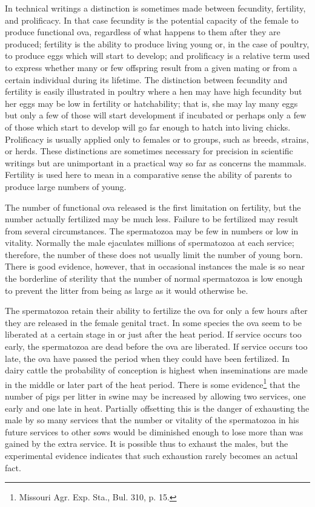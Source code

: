 In technical writings a distinction is sometimes made between fecundity,
fertility, and prolificacy. In that case fecundity is the potential
capacity of the female to produce functional ova, regardless of what
happens to them after they are produced; fertility is the ability to produce
living young or, in the case of poultry, to produce eggs which will
start to develop; and prolificacy is a relative term used to express
whether many or few offspring result from a given mating or from a
certain individual during its lifetime. The distinction between fecundity
and fertility is easily illustrated in poultry where a hen may have
high fecundity but her eggs may be low in fertility or hatchability; that
is, she may lay many eggs but only a few of those will start development
if incubated or perhaps only a few of those which start to develop will
go far enough to hatch into living chicks. Prolificacy is usually applied
only to females or to groups, such as breeds, strains, or herds. These
distinctions are sometimes necessary for precision in scientific writings
but are unimportant in a practical way so far as concerns the mammals.
Fertility is used here to mean in a comparative sense the ability
of parents to produce large numbers of young.

The number of functional ova released is the first limitation on fertility,
but the number actually fertilized may be much less. Failure to
be fertilized may result from several circumstances. The spermatozoa
may be few in numbers or low in vitality. Normally the male ejaculates
millions of spermatozoa at each service; therefore, the number of these
does not usually limit the number of young born. There is good evidence,
however, that in occasional instances the male is so near the
borderline of sterility that the number of normal spermatozoa is low
enough to prevent the litter from being as large as it would otherwise
be.

The spermatozoa retain their ability to fertilize the ova for only a
few hours after they are released in the female genital tract. In some
species the ova seem to be liberated at a certain stage in or just after the
heat period. If service occurs too early, the spermatozoa are dead before
the ova are liberated. If service occurs too late, the ova have passed the
period when they could have been fertilized. In dairy cattle the probability
of conception is highest when inseminations are made in the middle or later
part of the heat period. There is some evidence\footnote{Missouri Agr. Exp.
Sta., Bul. 310, p. 15.} that the number of pigs per litter in swine may be
increased by allowing two services, one early and one late in heat. Partially
offsetting this is the danger of exhausting the male by so many services that
the number or vitality of the spermatozoa in his future services to other sows
would be diminished enough to lose more than was gained by the extra service.
It is possible thus to exhaust the males, but the experimental evidence
indicates that such exhaustion rarely becomes an actual fact.

